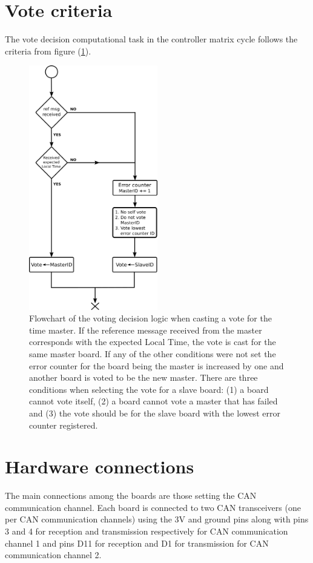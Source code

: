 \documentclass[table,xcdraw]{article}
\begin{document}
\section{Vote criteria} \label{app:vote_criteria}
The vote decision computational task in the controller matrix cycle follows the criteria from figure (\ref{fig:vote_criteria}).
\begin{figure}[h!]
    \centering
    \includegraphics[width=0.5\textwidth]{figures/methodology/voting_decision_making.png}
    \caption{Flowchart of the voting decision logic when casting a vote for the time master. If the reference message received from the master corresponds with the expected Local Time, the vote is cast for the same master board. If any of the other conditions were not set the error counter for the board being the master is increased by one and another board is voted to be the new master. There are three conditions when selecting the vote for a slave board: (1) a board cannot vote itself, (2) a board cannot vote a master that has failed and (3) the vote should be for the slave board with the lowest error counter registered.}
    \label{fig:vote_criteria}
\end{figure}



\newpage
\section{Hardware connections} \label{app:hardware_connections}
The main connections among the boards are those setting the CAN communication channel. Each board is connected to two CAN transceivers (one per CAN communication channels) using the 3V and ground pins along with pins 3 and 4 for reception and transmission respectively for CAN communication channel 1 and pins D11 for reception and D1 for transmission for CAN communication channel 2.\\
\end{document}
